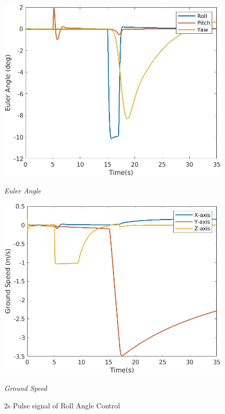 \begin{figure}[htbp]
  \centering
  \begin{minipage}[b]{0.45\textwidth}
    \centering
    \includegraphics[width=\textwidth]{Images/Attitude Control Plot/1 EulerAngle3.jpg}
    \caption*{\textit{Euler Angle}}
  \end{minipage}
  \hfil
  \begin{minipage}[b]{0.45\textwidth}
    \centering
    \includegraphics[width=\textwidth]{Images/Attitude Control Plot/2 groundspeed_3.jpg}
    \caption*{\textit{Ground Speed}}
  \end{minipage}
  \caption{2s Pulse signal of Roll Angle Control}
  \label{fig:attitude control roll}
\end{figure}

